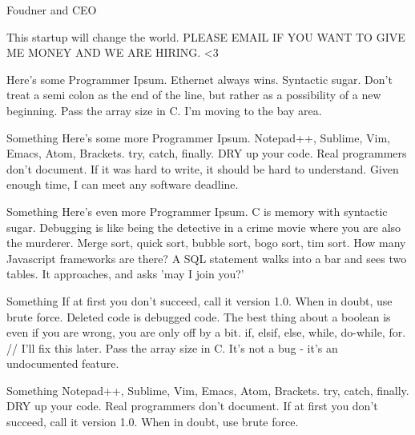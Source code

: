 \documentclass[10pt]{akshay-resume}
\begin{document}
\begin{minipage}[t]{0.6\textwidth} 




{Foudner and CEO}
{\begin{tightemize}
\item This startup will change the world. PLEASE EMAIL IF YOU WANT TO GIVE ME MONEY AND WE ARE HIRING. <3
\item Here's some Programmer Ipsum. Ethernet always wins. Syntactic sugar. Don't treat a semi colon as the end of the line, but rather as a possibility of a new beginning. Pass the array size in C. I'm moving to the bay area.
\end{tightemize}
}


{Something}
{Here's some more Programmer Ipsum. Notepad++, Sublime, Vim, Emacs, Atom, Brackets. try, catch, finally. DRY up your code. Real programmers don't document. If it was hard to write, it should be hard to understand. Given enough time, I can meet any software deadline.}


{Something}
{Here's even more Programmer Ipsum. C is memory with syntactic sugar. Debugging is like being the detective in a crime movie where you are also the murderer. Merge sort, quick sort, bubble sort, bogo sort, tim sort. How many Javascript frameworks are there? A SQL statement walks into a bar and sees two tables. It approaches, and asks 'may I join you?'}


{Something}
{If at first you don't succeed, call it version 1.0. When in doubt, use brute force. Deleted code is debugged code. The best thing about a boolean is even if you are wrong, you are only off by a bit. if, elsif, else, while, do-while, for. // I'll fix this later. Pass the array size in C. It's not a bug - it's an undocumented feature.}


{Something}
{Notepad++, Sublime, Vim, Emacs, Atom, Brackets. try, catch, finally. DRY up your code. Real programmers don't document. If at first you don't succeed, call it version 1.0. When in doubt, use brute force. }


\end{minipage}
\end{document}
